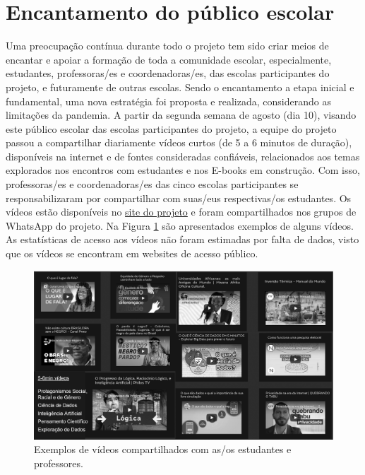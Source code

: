 \documentclass[
]{book}
\begin{document}
\hypertarget{encantamento-do-puxfablico-escolar}{%
\section{Encantamento do público escolar}\label{encantamento-do-puxfablico-escolar}}

Uma preocupação contínua durante todo o projeto tem sido criar meios
de encantar e apoiar a formação de toda a comunidade escolar,
especialmente, estudantes, professoras/es e coordenadoras/es, das
escolas participantes do projeto, e futuramente de outras escolas.
Sendo o encantamento a etapa inicial e fundamental, uma nova
estratégia foi proposta e realizada, considerando as limitações da
pandemia. A partir da segunda semana de agosto (dia 10), visando este
público escolar das escolas participantes do projeto, a equipe do
projeto passou a compartilhar diariamente vídeos curtos (de 5 a 6
minutos de duração), disponíveis na internet e de fontes consideradas
confiáveis, relacionados aos temas explorados nos encontros com
estudantes e nos E-books em construção. Com isso, professoras/es e
coordenadoras/es das cinco escolas participantes se responsabilizaram
por compartilhar com suas/eus respectivas/os estudantes. Os vídeos
estão disponíveis no \href{https://cienciadedadosep.wixsite.com/estudantes/videos}{site do projeto} e
foram compartilhados nos grupos de WhatsApp do projeto. Na Figura
\ref{fig:exemplosvideo}
são apresentados exemplos de alguns vídeos. As estatísticas de acesso
aos vídeos não foram estimadas por falta de dados, visto que os vídeos se encontram em websites de acesso público.

\begin{figure}
\includegraphics[width=18.33in]{images/image96} \caption{Exemplos de vídeos compartilhados com as/os estudantes e professores.}\label{fig:exemplosvideo}
\end{figure}
\end{document}
